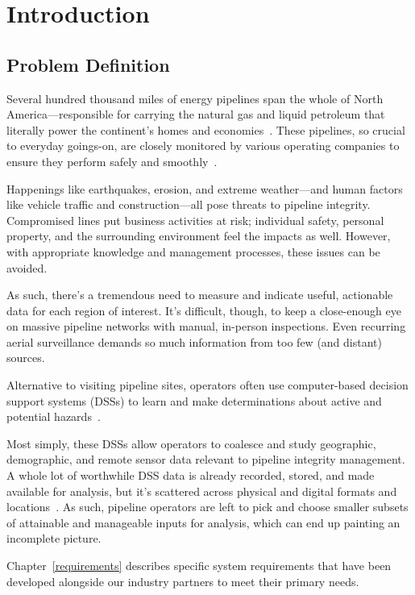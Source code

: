\chapter{Introduction}
\label{intro}

\section{Problem Definition}
\label{Problem}
Several hundred thousand miles of energy pipelines span the whole of North America---responsible for carrying the natural gas and liquid petroleum that literally power the continent's homes and economies~\cite{PHMSA}. These pipelines, so crucial to everyday goings-on, are closely monitored by various operating companies to ensure they perform safely and smoothly~\cite{PHMSA2013}.

Happenings like earthquakes, erosion, and extreme weather---and human factors like vehicle traffic and construction---all pose threats to pipeline integrity. Compromised lines put business activities at risk; individual safety, personal property, and the surrounding environment feel the impacts as well. However, with appropriate knowledge and management processes, these issues can be avoided.

As such, there's a tremendous need to measure and indicate useful, actionable data for each region of interest. It's difficult, though, to keep a close-enough eye on massive pipeline networks with manual, in-person inspections. Even recurring aerial surveillance demands so much information from too few (and distant) sources.

Alternative to visiting pipeline sites, operators often use computer-based decision support systems (DSSs) to learn and make determinations about active and potential hazards~\cite{PHMSA2013,Dunning2013}. 

Most simply, these DSSs allow operators to coalesce and study geographic, demographic, and remote sensor data relevant to pipeline integrity management. A whole lot of worthwhile DSS data is already recorded, stored, and made available for analysis, but it's scattered across physical and digital formats and locations~\cite{Dunning2013}. As such, pipeline operators are left to pick and choose smaller subsets of attainable and manageable inputs for analysis, which can end up painting an incomplete picture.

Chapter~\ref{requirements} describes specific system requirements that have been developed alongside our industry partners to meet their primary needs.

